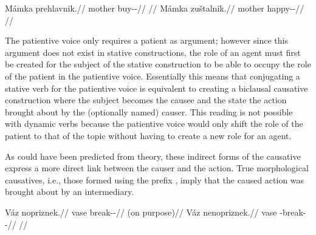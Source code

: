 \pex
\a
\begingl
    \gla \ljudge{*}Mámka prehlavnik.//
    \glb mother buy-\Pv{}-\Pf{}//
    \glft {}//
\endgl
\a
\begingl
    \gla Mámka zuštalnik.//
    \glb mother happy-\Pv{}-\Pf{}//
    \glft {}//
\endgl
\xe

The patientive voice only requires a patient as argument; however since this argument does not exist in stative constructions, the role of an agent must first be created for the subject of the stative construction to be able to occupy the role of the patient in the patientive voice. Essentially this means that conjugating a stative verb for the patientive voice is equivalent to creating a biclausal causative construction where the subject becomes the causee and the state the action brought about by the (optionally named) causer. This reading is not possible with dynamic verbs because the patientive voice would only shift the role of the patient to that of the topic without having to create a new role for an agent.

As could have been predicted from  theory, these indirect forms of the causative express a more direct link between the causer and the action. True morphological causatives, i.e., those formed using the prefix , imply that the caused action was brought about by an intermediary.

\begin{multicols}{2}
\pex
\a
\begingl
\gla Váz nopriznek.//
\glb vase break-\Pv{}-\Pf{}//
\glft {} (on purpose)//
\endgl
\a
\begingl
\gla Váz nenopriznek.//
\glb vase \Caus{}-break-\Pv{}-\Pf{}//
\glft {}//
\endgl
\xe
\end{multicols}

